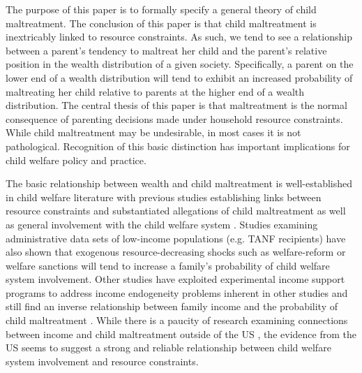 \documentclass[1p, review]{elsarticle}\usepackage[]{graphicx}\usepackage[]{color}
\begin{document}
The purpose of this paper is to formally specify a general theory of child maltreatment. The conclusion of this paper is that child maltreatment is inextricably linked to resource constraints. As such, we tend to see a relationship between a parent’s tendency to maltreat her child and the parent’s relative position in the wealth distribution of a given society. Specifically, a parent on the lower end of a wealth distribution will tend to exhibit an increased probability of maltreating her child relative to parents at the higher end of a wealth distribution. The central thesis of this paper is that maltreatment is the normal consequence of parenting decisions made under household resource constraints. While child maltreatment may be undesirable, in most cases it is not pathological. Recognition of this basic distinction has important implications for child welfare policy and practice. 

The basic relationship between wealth and child maltreatment is well-established in child welfare literature with previous studies establishing links between resource constraints and substantiated allegations of child maltreatment as well as general involvement with the child welfare system \citep{Gil1970, Pelton1981, Pelton1994, Russell1984, Sedlak1996, Stith2009, BergerAndWoldfogel2004}. Studies examining administrative data sets of low-income populations (e.g. TANF recipients) have also shown that exogenous resource-decreasing shocks such as welfare-reform \citep{Courtney2005} or welfare sanctions \citep{Slack2007} will tend to increase a family's probability of child welfare system involvement. Other studies have exploited experimental income support programs to address income endogeneity problems inherent in other studies and still find an inverse relationship between family income and the probability of child maltreatment \citep{Cancian2013, Fein2003}. While there is a paucity of research examining connections between income and child maltreatment outside of the US \citep{Cameron2006}, the evidence from the US seems to suggest a strong and reliable relationship between child welfare system involvement and resource constraints. 
\end{document}
